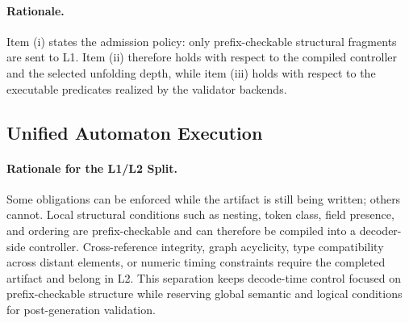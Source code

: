 \documentclass[acmlarge,nonacm]{acmart}
\theoremstyle{acmplain}
\theoremstyle{acmdefinition}
\begin{document}
\paragraph{Rationale.}
Item (i) states the admission policy: only prefix-checkable structural fragments are sent to L1. Item (ii) therefore holds with respect to the compiled controller and the selected unfolding depth, while item (iii) holds with respect to the executable predicates realized by the validator backends.

\subsection{Unified Automaton Execution}
\label{sec:generation-strategy}

\paragraph{Rationale for the L1/L2 Split.}
Some obligations can be enforced while the artifact is still being written; others cannot. Local structural conditions such as nesting, token class, field presence, and ordering are prefix-checkable and can therefore be compiled into a decoder-side controller. Cross-reference integrity, graph acyclicity, type compatibility across distant elements, or numeric timing constraints require the completed artifact and belong in L2. This separation keeps decode-time control focused on prefix-checkable structure while reserving global semantic and logical conditions for post-generation validation.
\end{document}
